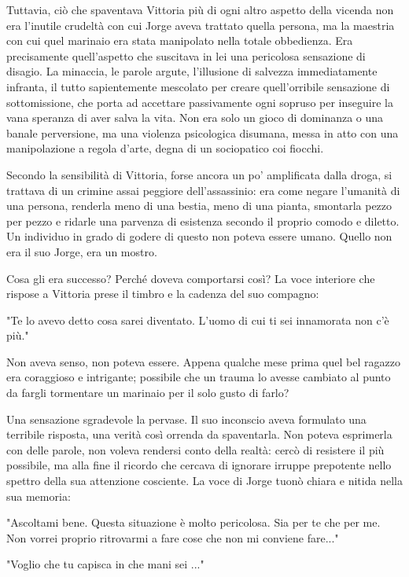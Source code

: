 Tuttavia, ciò che spaventava Vittoria più di ogni altro aspetto della vicenda non era l'inutile crudeltà con cui Jorge aveva trattato quella persona, ma la maestria con cui quel marinaio era stata manipolato nella totale obbedienza. Era precisamente quell'aspetto che suscitava in lei una pericolosa sensazione di disagio. La minaccia, le parole argute, l'illusione di salvezza immediatamente infranta, il tutto sapientemente mescolato per creare quell'orribile sensazione di sottomissione, che porta ad accettare passivamente ogni sopruso per inseguire la vana speranza di aver salva la vita. Non era solo un gioco di dominanza o una banale perversione, ma una violenza psicologica disumana, messa in atto con una manipolazione a regola d'arte, degna di un sociopatico coi fiocchi.

Secondo la sensibilità di Vittoria, forse ancora un po' amplificata dalla droga, si trattava di un crimine assai peggiore dell'assassinio: era come negare l'umanità di una persona, renderla meno di una bestia, meno di una pianta, smontarla pezzo per pezzo e ridarle una parvenza di esistenza secondo il proprio comodo e diletto. Un individuo in grado di godere di questo non poteva essere umano. Quello non era il suo Jorge, era un mostro.

Cosa gli era successo? Perché doveva comportarsi così? La voce interiore che rispose a Vittoria prese il timbro e la cadenza del suo compagno:

"Te lo avevo detto cosa sarei diventato. L'uomo di cui ti sei innamorata non c'è più."

Non aveva senso, non poteva essere. Appena qualche mese prima quel bel ragazzo era coraggioso e intrigante; possibile che un trauma lo avesse cambiato al punto da fargli tormentare un marinaio per il solo gusto di farlo?

Una sensazione sgradevole la pervase. Il suo inconscio aveva formulato una terribile risposta, una verità così orrenda da spaventarla. Non poteva esprimerla con delle parole, non voleva rendersi conto della realtà: cercò di resistere il più possibile, ma alla fine il ricordo che cercava di ignorare irruppe prepotente nello spettro della sua attenzione cosciente. La voce di Jorge tuonò chiara e nitida nella sua memoria:

"Ascoltami bene. Questa situazione è molto pericolosa. Sia per te che per me. Non vorrei proprio ritrovarmi a fare cose che non mi conviene fare..."

"Voglio che tu capisca in che mani sei ..."

